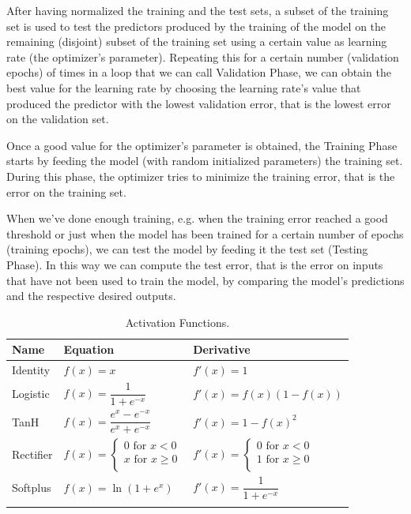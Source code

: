 \documentclass[10pt,journal,A4paper,compsoc,epsfig]{IEEEtran}
\begin{document}
After having normalized the training and the test sets, a subset of the training set is used to test the predictors produced by the training of the model on the remaining (disjoint) subset of the training set using a certain value as learning rate (the optimizer's parameter). Repeating this for a certain number (validation epochs) of times in a loop that we can call Validation Phase, we can obtain the best value for the learning rate by choosing the learning rate's value that produced the predictor with the lowest validation error, that is the lowest error on the validation set.

Once a good value for the optimizer's parameter is obtained, the Training Phase starts by feeding the model (with random initialized parameters) the training set. During this phase, the optimizer tries to minimize the training error, that is the error on the training set.

When we've done enough training, e.g. when the training error reached a good threshold or just when the model has been trained for a certain number of epochs (training epochs), we can test the model by feeding it the test set (Testing Phase). In this way we can compute the test error, that is the error on inputs that have not been used to train the model, by comparing the model's predictions and the respective desired outputs.


\begin{table}
\centering
\begin{tabular}{l l l}
Name & Equation & Derivative \\
\hline
\noalign{\medskip}
Identity & $f(x)=x$ & $f'(x)=1$ \\
\noalign{\smallskip}
Logistic & $f(x)= \dfrac{1}{1+e^{-x}}$ & $f'(x)=f(x)(1-f(x))$ \\
\noalign{\smallskip}
TanH & $f(x)= \dfrac{e^x - e^{-x}}{e^x + e^{-x}}$ & $f'(x)=1-f(x)^2$ \\
\noalign{\smallskip}
Rectifier & $f(x)=\begin{cases}
						0 \textrm{ for } x < 0 \\
						x \textrm{ for } x \geq 0 \\
				  \end{cases}$ & $f'(x)=\begin{cases}
						0 \textrm{ for } x < 0 \\
						1 \textrm{ for } x \geq 0 \\
				  \end{cases}$ \\
\noalign{\smallskip}
Softplus & $f(x)=\ln(1+e^x)$ & $f'(x)=\dfrac{1}{1+e^{-x}}$ \\
\noalign{\smallskip}
\hline
\end{tabular}
\caption{Activation Functions.}
\label{table_activation}
\end{table}%
\end{document}
